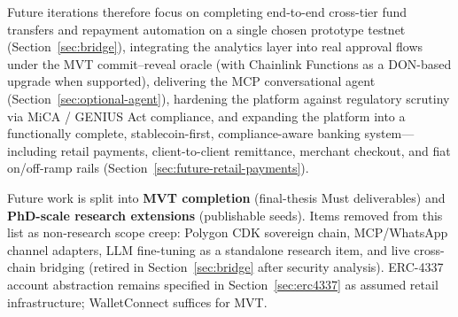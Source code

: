 \documentclass[12pt,a4paper]{report}
\begin{document}
Future iterations therefore focus on completing end-to-end cross-tier fund transfers and repayment automation on a single chosen prototype testnet (Section~\ref{sec:bridge}), integrating the analytics layer into real approval flows under the MVT commit--reveal oracle (with Chainlink Functions as a DON-based upgrade when supported), delivering the MCP conversational agent (Section~\ref{sec:optional-agent}), hardening the platform against regulatory scrutiny via MiCA / GENIUS Act compliance, and expanding the platform into a functionally complete, stablecoin-first, compliance-aware banking system---including retail payments, client-to-client remittance, merchant checkout, and fiat on/off-ramp rails (Section~\ref{sec:future-retail-payments}).

Future work is split into \textbf{MVT completion} (final-thesis Must deliverables) and \textbf{PhD-scale research extensions} (publishable seeds). Items removed from this list as non-research scope creep: Polygon CDK sovereign chain, MCP/WhatsApp channel adapters, LLM fine-tuning as a standalone research item, and live cross-chain bridging (retired in Section~\ref{sec:bridge} after security analysis). ERC-4337 account abstraction remains specified in Section~\ref{sec:erc4337} as assumed retail infrastructure; WalletConnect suffices for MVT.
\label{sec:future-work}
\end{document}
